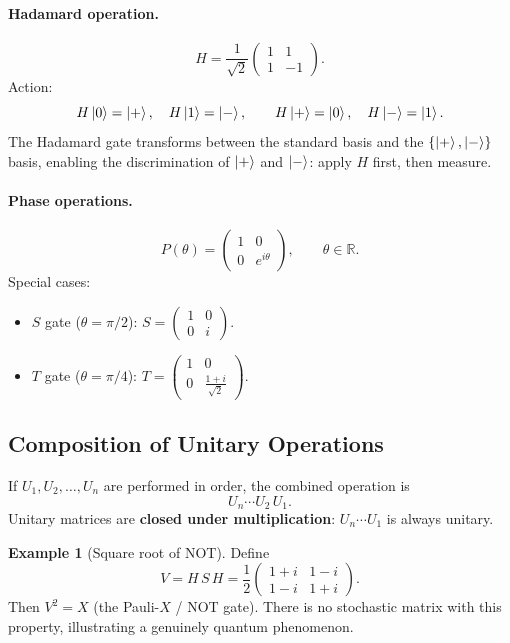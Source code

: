 \documentclass[11pt]{article}
\theoremstyle{definition}
\newtheorem{example}{Example}[section]
\begin{document}
\paragraph{Hadamard operation.}
\[
    H = \frac{1}{\sqrt{2}}\begin{pmatrix}1&1\\1&-1\end{pmatrix}.
\]
Action:
\[
    H\ket{0}=\ket{+},\quad H\ket{1}=\ket{-},\qquad
    H\ket{+}=\ket{0},\quad H\ket{-}=\ket{1}.
\]
The Hadamard gate transforms between the standard basis and the $\{\ket{+},\ket{-}\}$ basis, enabling the discrimination of $\ket{+}$ and $\ket{-}$: apply $H$ first, then measure.

\paragraph{Phase operations.}
\[
    P(\theta) = \begin{pmatrix}1&0\\0&e^{i\theta}\end{pmatrix}, \qquad \theta\in\mathbb{R}.
\]
Special cases:
\begin{itemize}
    \item $S$ gate ($\theta=\pi/2$): $S = \begin{pmatrix}1&0\\0&i\end{pmatrix}$.
    \item $T$ gate ($\theta=\pi/4$): $T = \begin{pmatrix}1&0\\0&\frac{1+i}{\sqrt{2}}\end{pmatrix}$.
\end{itemize}

\subsection{Composition of Unitary Operations}

If $U_1,U_2,\dots,U_n$ are performed in order, the combined operation is
\[
    U_n\cdots U_2\,U_1.
\]
Unitary matrices are \textbf{closed under multiplication}: $U_n\cdots U_1$ is always unitary.

\begin{example}[Square root of NOT]
Define
\[
    V = H\,S\,H = \frac{1}{2}\begin{pmatrix}1+i & 1-i \\ 1-i & 1+i\end{pmatrix}.
\]
Then $V^2 = X$ (the Pauli-$X$ / NOT gate).  There is no stochastic matrix with this property, illustrating a genuinely quantum phenomenon.
\end{example}
\end{document}

